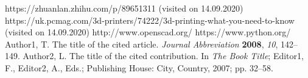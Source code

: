\documentclass[journal,article,submit,moreauthors,pdftex]{Definitions/mdpi}
\begin{document}

\begin{thebibliography}{999}
https://zhuanlan.zhihu.com/p/89651311 (visited on 14.09.2020)
https://uk.pcmag.com/3d-printers/74222/3d-printing-what-you-need-to-know (visited on 14.09.2020)
http://www.openscad.org/
https://www.python.org/
Author1, T. The title of the cited article. {\em Journal Abbreviation} {\bf 2008}, {\em 10}, 142--149.
Author2, L. The title of the cited contribution. In {\em The Book Title}; Editor1, F., Editor2, A., Eds.; Publishing House: City, Country, 2007; pp. 32--58.
\end{thebibliography}


%



\end{document}
